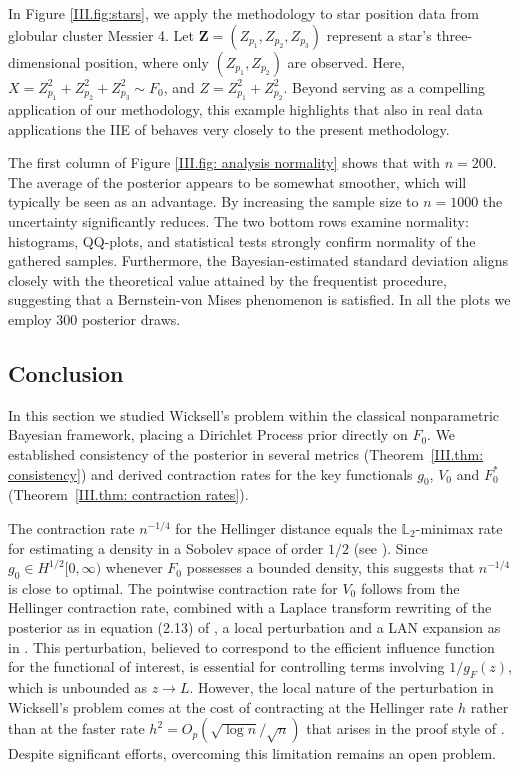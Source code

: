 In Figure \ref{III.fig:stars}, we apply the methodology to star position data from globular cluster Messier 4. Let \( \mathbf{Z} = (Z_{p_1}, Z_{p_2}, Z_{p_3}) \) represent a star's three-dimensional position, where only \( (Z_{p_1}, Z_{p_2}) \) are observed. Here, \( X = Z_{p_1}^2 + Z_{p_2}^2 + Z_{p_3}^2 \sim F_0 \), and \( Z = Z_{p_1}^2 + Z_{p_2}^2 \). Beyond serving as a compelling application of our methodology, this example highlights that also in real data applications the IIE of \cite{27} behaves very closely to the present methodology. 

The first column of Figure \ref{III.fig: analysis normality} shows that with \( n = 200 \). The average of the posterior appears to be somewhat smoother, which will typically be seen as an advantage. By increasing the sample size to \( n = 1000 \) the uncertainty significantly reduces. The two bottom rows examine normality: histograms, QQ-plots, and statistical tests strongly confirm normality of the gathered samples. Furthermore, the Bayesian-estimated standard deviation aligns closely with the theoretical value attained by the frequentist procedure, suggesting that a Bernstein-von Mises phenomenon is satisfied. In all the plots we employ 300 posterior draws.

\subsection{Conclusion}\label{III.sec: conclusion}

In this section we studied Wicksell's problem within the classical nonparametric Bayesian framework, placing a Dirichlet Process prior directly on $F_0$. We established consistency of the posterior in several metrics (Theorem~\ref{III.thm: consistency}) and derived contraction rates for the key functionals $g_0$, $V_0$ and $F^*_0$ (Theorem~\ref{III.thm: contraction rates}).

The contraction rate $n^{-1/4}$ for the Hellinger distance equals the $\mathbb{L}_2$-minimax rate for estimating a density in a Sobolev space of order $1/2$ (see \cite{45}). Since $g_0 \in H^{1/2}[0,\infty)$ whenever $F_0$ possesses a bounded density, this suggests that $n^{-1/4}$ is close to optimal. The pointwise contraction rate for $V_0$ follows from the Hellinger contraction rate, combined with a Laplace transform rewriting of the posterior as in equation (2.13) of \cite{37}, a local perturbation and a LAN expansion as in \cite{27}. This perturbation, believed to correspond to the efficient influence function for the functional of interest, is essential for controlling terms involving $1/g_{\scriptscriptstyle{F}}(z)$, which is unbounded as $z \to L$. However, the local nature of the perturbation in Wicksell's problem comes at the cost of contracting at the Hellinger rate $h$ rather than at the faster rate $h^2 = O_p(\sqrt{\log n}/\sqrt{n})$ that arises in the proof style of \cite{37}. Despite significant efforts, overcoming this limitation remains an open problem.

